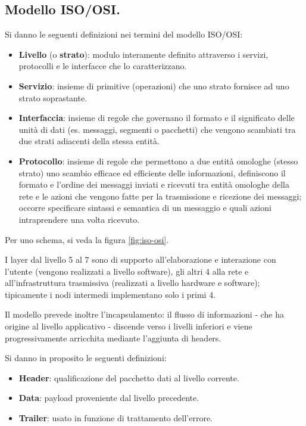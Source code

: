 \documentclass[11pt, italian, openany]{book}
\begin{document}
\begin{sloppypar}
\subsection{Modello ISO/OSI.}
Si danno le seguenti definizioni nei termini del modello ISO/OSI:
\begin{itemize}[topsep=0pt, itemsep=0pt, parsep=0pt]
	\item \textbf{Livello} (o \textbf{strato}): modulo interamente definito attraverso i servizi, protocolli e le interfacce che lo caratterizzano.
	\item \textbf{Servizio}: insieme di primitive (operazioni) che uno strato fornisce ad uno strato soprastante.
	\item \textbf{Interfaccia}: insieme di regole che governano il formato e il significato delle unit\`a di dati (es. messaggi, segmenti o
	pacchetti) che vengono scambiati tra due strati adiacenti della stessa entit\`a.
	\item \textbf{Protocollo}: insieme di regole che permettono a due entit\`a omologhe (stesso strato) uno scambio efficace ed efficiente delle
	informazioni, definiscono il formato e l’ordine dei messaggi inviati e ricevuti tra entit\`a omologhe della rete e le azioni che vengono
	fatte per la trasmissione e ricezione dei messaggi; occorre specificare sintassi e semantica di un messaggio e quali azioni intraprendere
	una volta ricevuto.
\end{itemize}

Per uno schema, si veda la figura \ref{fig:iso-osi}.

I layer dal livello 5 al 7 sono di supporto all'elaborazione e interazione con l'utente (vengono realizzati a livello software), gli altri 4
alla rete e all'infrastruttura trasmissiva (realizzati a livello hardware e software); tipicamente i nodi intermedi implementano solo i primi
4.

Il modello prevede inoltre l'incapsulamento: il flusso di informazioni - che ha origine al livello applicativo - discende verso i livelli inferiori e
viene progressivamente arricchita mediante l'aggiunta di headers.

Si danno in proposito le seguenti definizioni:
\begin{itemize}[topsep=0pt, itemsep=0pt, parsep=0pt]
	\item \textbf{Header}: qualificazione del pacchetto dati al livello corrente.
	\item \textbf{Data}: payload proveniente dal livello precedente.
	\item \textbf{Trailer}: usato in funzione di trattamento dell'errore.
\end{itemize}


\end{sloppypar}
\end{document}
